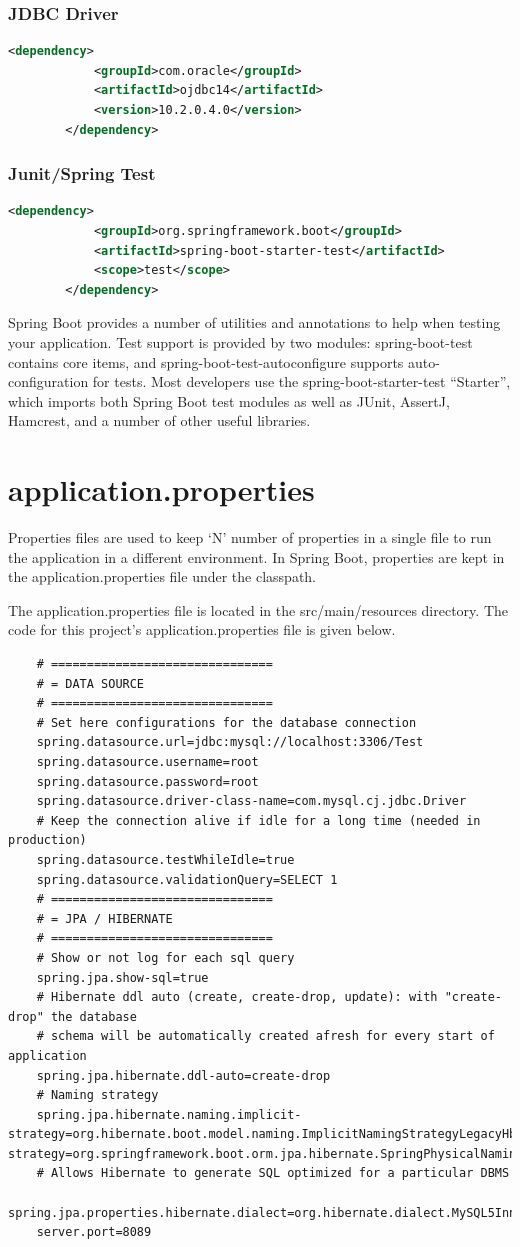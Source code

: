 \documentclass{report}
\begin{document}
	\subsubsection{JDBC Driver}
		\begin{lstlisting}[language=xml]
		<dependency>
			<groupId>com.oracle</groupId>
			<artifactId>ojdbc14</artifactId>
			<version>10.2.0.4.0</version>
		</dependency>
		\end{lstlisting}
	\subsubsection{Junit/Spring Test}
		\begin{lstlisting}[language=xml]
		<dependency>
			<groupId>org.springframework.boot</groupId>
			<artifactId>spring-boot-starter-test</artifactId>
			<scope>test</scope>
		</dependency>
		\end{lstlisting}
		Spring Boot provides a number of utilities and annotations to help when testing your 	application. Test support is provided by two modules: spring-boot-test contains core 	items, and spring-boot-test-autoconfigure supports auto-configuration for tests.
		Most developers use the spring-boot-starter-test “Starter”, which imports both 	Spring Boot test modules as well as JUnit, AssertJ, Hamcrest, and a number of other useful 	libraries.	
	\newpage
	\section{application.properties}
	Properties files are used to keep ‘N’ number of properties in a single file to run the application in a different environment. In Spring Boot, properties are kept in the application.properties file under the classpath.
	\par The application.properties file is located in the src/main/resources directory. The code for this project’s application.properties file is given below.
	\begin{lstlisting}
	# ===============================
	# = DATA SOURCE
	# ===============================
	# Set here configurations for the database connection
	spring.datasource.url=jdbc:mysql://localhost:3306/Test
	spring.datasource.username=root
	spring.datasource.password=root
	spring.datasource.driver-class-name=com.mysql.cj.jdbc.Driver
	# Keep the connection alive if idle for a long time (needed in production)
	spring.datasource.testWhileIdle=true
	spring.datasource.validationQuery=SELECT 1
	# ===============================
	# = JPA / HIBERNATE
	# ===============================
	# Show or not log for each sql query
	spring.jpa.show-sql=true
	# Hibernate ddl auto (create, create-drop, update): with "create-drop" the database
	# schema will be automatically created afresh for every start of application
	spring.jpa.hibernate.ddl-auto=create-drop
	# Naming strategy
	spring.jpa.hibernate.naming.implicit-strategy=org.hibernate.boot.model.naming.ImplicitNamingStrategyLegacyHbmImplspring.jpa.hibernate.naming.physical-strategy=org.springframework.boot.orm.jpa.hibernate.SpringPhysicalNamingStrategy
	# Allows Hibernate to generate SQL optimized for a particular DBMS
	spring.jpa.properties.hibernate.dialect=org.hibernate.dialect.MySQL5InnoDBDialect
	server.port=8089
	\end{lstlisting}
\end{document}
